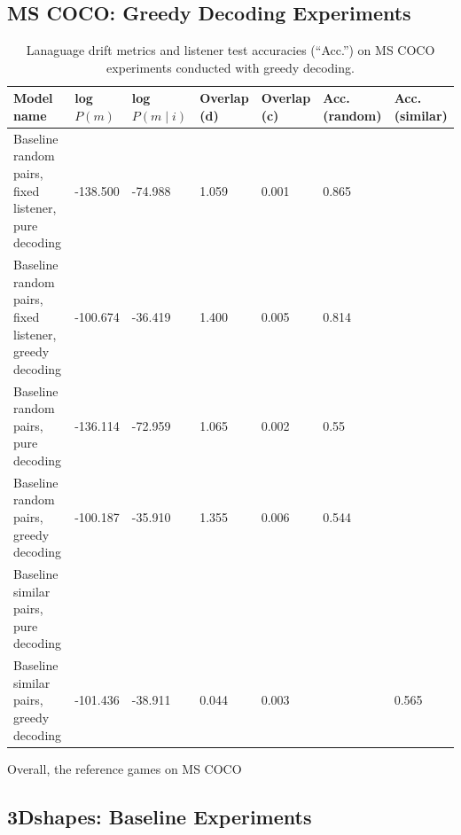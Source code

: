 \subsection{MS COCO: Greedy Decoding Experiments}
\begin{table}[]
	\begin{tabularx}{\linewidth}{|X|l|l|X|X|X|X|}
		\hline
			\textbf{Model name}                                    & \textbf{log $P(m)$} & \textbf{log $P(m \mid i)$} & \textbf{Overlap (d)} & \textbf{Overlap (c)} & \textbf{Acc. (random)} & \textbf{Acc. (similar)} \\ \hline
			 Baseline random pairs, fixed listener, pure decoding   &     -138.500         &         -74.988               &       1.059            &      0.001               &       0.865          &                \\ \hline
			 Baseline random pairs, fixed listener, greedy decoding   &     -100.674     &         -36.419              &       1.400       &      0.005             &       0.814          &                \\ \hline
			 Baseline random pairs, pure decoding   & -136.114        &      -72.959            &       1.065          &      0.002               &       0.55          &                \\ \hline
			 Baseline random pairs, greedy decoding   &-100.187      &    -35.910            &       1.355          &      0.006            &       0.544         &                \\ \hline
			 Baseline similar pairs, pure decoding   &    &         &     &       &            &          \\ \hline
			 Baseline similar pairs, greedy decoding   &   -101.436  &      -38.911        &     0.044   &     0.003     &            &     0.565           \\ \hline
			 
	\end{tabularx}
\caption{\label{tab:coco_greedy}Lanaguage drift metrics and listener test accuracies (``Acc.'') on MS COCO experiments conducted with greedy decoding.}
\end{table}

 Overall, the reference games on MS COCO 

\subsection{3Dshapes: Baseline Experiments}
\label{expt:3dshapes_baseline}

